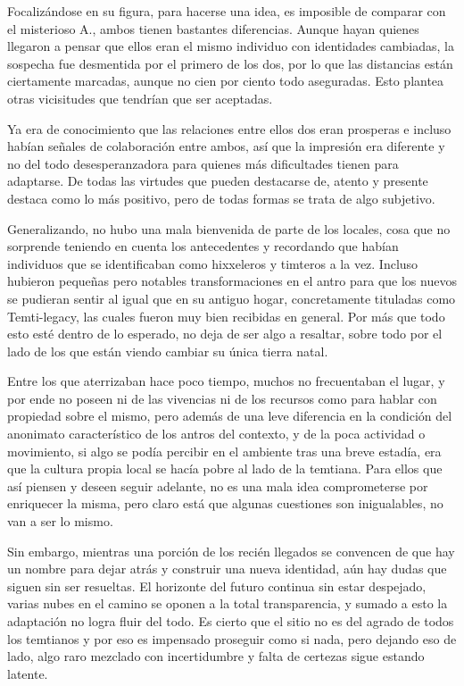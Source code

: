 \documentclass[
]{book}
\begin{document}
Focalizándose en su figura, para hacerse una idea, es imposible de comparar con el misterioso A., ambos tienen bastantes diferencias. Aunque hayan quienes llegaron a pensar que ellos eran el mismo individuo con identidades cambiadas, la sospecha fue desmentida por el primero de los dos, por lo que las distancias están ciertamente marcadas, aunque no cien por ciento todo aseguradas. Esto plantea otras vicisitudes que tendrían que ser aceptadas.

Ya era de conocimiento que las relaciones entre ellos dos eran prosperas e incluso habían señales de colaboración entre ambos, así que la impresión era diferente y no del todo desesperanzadora para quienes más dificultades tienen para adaptarse. De todas las virtudes que pueden destacarse de, atento y presente destaca como lo más positivo, pero de todas formas se trata de algo subjetivo.

Generalizando, no hubo una mala bienvenida de parte de los locales, cosa que no sorprende teniendo en cuenta los antecedentes y recordando que habían individuos que se identificaban como hixxeleros y timteros a la vez. Incluso hubieron pequeñas pero notables transformaciones en el antro para que los nuevos se pudieran sentir al igual que en su antiguo hogar, concretamente tituladas como Temti-legacy, las cuales fueron muy bien recibidas en general. Por más que todo esto esté dentro de lo esperado, no deja de ser algo a resaltar, sobre todo por el lado de los que están viendo cambiar su única tierra natal.

Entre los que aterrizaban hace poco tiempo, muchos no frecuentaban el lugar, y por ende no poseen ni de las vivencias ni de los recursos como para hablar con propiedad sobre el mismo, pero además de una leve diferencia en la condición del anonimato característico de los antros del contexto, y de la poca actividad o movimiento, si algo se podía percibir en el ambiente tras una breve estadía, era que la cultura propia local se hacía pobre al lado de la temtiana. Para ellos que así piensen y deseen seguir adelante, no es una mala idea comprometerse por enriquecer la misma, pero claro está que algunas cuestiones son inigualables, no van a ser lo mismo.

Sin embargo, mientras una porción de los recién llegados se convencen de que hay un nombre para dejar atrás y construir una nueva identidad, aún hay dudas que siguen sin ser resueltas. El horizonte del futuro continua sin estar despejado, varias nubes en el camino se oponen a la total transparencia, y sumado a esto la adaptación no logra fluir del todo. Es cierto que el sitio no es del agrado de todos los temtianos y por eso es impensado proseguir como si nada, pero dejando eso de lado, algo raro mezclado con incertidumbre y falta de certezas sigue estando latente.
\end{document}
